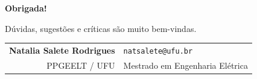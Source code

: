 \documentclass[aspectratio=169,10pt]{beamer}
\begin{document}
\begin{frame}[plain]
  \vfill
  \centering
  {\Huge \color{cafeEscuro} \textbf{Obrigada!}}

  \vspace{1.2em}
  \large Dúvidas, sugestões e críticas são muito bem-vindas.
  \vspace{1.5em}

  \begin{tabular}{rl}
    \textbf{Natalia Salete Rodrigues} & \texttt{natsalete@ufu.br} \\
    PPGEELT / UFU & Mestrado em Engenharia Elétrica \\
  \end{tabular}
  \vfill
\end{frame}
\end{document}
